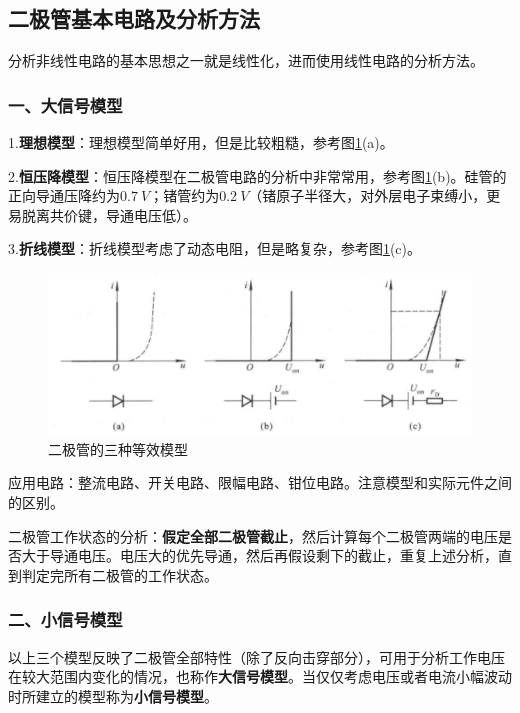 \subsection{二极管基本电路及分析方法}
分析非线性电路的基本思想之一就是线性化，进而使用线性电路的分析方法。

\subsubsection{一、大信号模型}
1.\textbf{理想模型}：理想模型简单好用，但是比较粗糙，参考图\ref{二极管的三种等效模型}(a)。

2.\textbf{恒压降模型}：恒压降模型在⼆极管电路的分析中非常常用，参考图\ref{二极管的三种等效模型}(b)。硅管的正向导通压降约为$\qty{0.7}{V}$；锗管约为$\qty{0.2}{V}$（锗原子半径大，对外层电子束缚小，更易脱离共价键，导通电压低）。

3.\textbf{折线模型}：折线模型考虑了动态电阻，但是略复杂，参考图\ref{二极管的三种等效模型}(c)。

\begin{figure}[htb]
    \centering
    \includegraphics[width=0.8\linewidth]{pic/二极管的三种等效模型.png}
    \caption{二极管的三种等效模型\cite{华成英}\label{二极管的三种等效模型}}
\end{figure}

应用电路：整流电路、开关电路、限幅电路、钳位电路。注意模型和实际元件之间的区别。

二极管工作状态的分析：\textbf{假定全部二极管截止}，然后计算每个二极管两端的电压是否大于导通电压。电压大的优先导通，然后再假设剩下的截止，重复上述分析，直到判定完所有二极管的工作状态。

\subsubsection{二、小信号模型}
以上三个模型反映了二极管全部特性（除了反向击穿部分），可用于分析工作电压在较大范围内变化的情况，也称作\textbf{大信号模型}。当仅仅考虑电压或者电流小幅波动时所建立的模型称为\textbf{小信号模型}。

